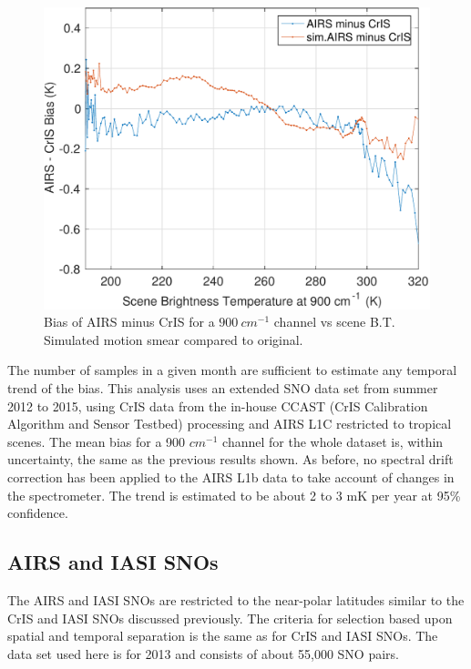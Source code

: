 \documentclass[twocolumn,10pt]{article}
\begin{document}
\begin{figure}[htb]
\centering
\includegraphics[width=\linewidth]{./figs/2013_ac_quantile_plus_simulated_airs.pdf}
\caption{
  Bias of AIRS minus CrIS for a $900\ cm^{-1}$ channel vs scene B.T. Simulated motion smear compared to original.}
\label{fig:Y9}
\end{figure}

The number of samples in a given month are sufficient to estimate any temporal trend of the bias. This analysis uses an extended SNO data set from summer 2012 to 2015, using CrIS data from the in-house CCAST (CrIS Calibration Algorithm and Sensor Testbed) processing \cite{Motteler2014} and AIRS L1C restricted to tropical scenes. The mean
bias for a 900 $cm^{-1}$ channel for the whole dataset is, within uncertainty, the same as the previous results shown. As before, no spectral drift correction has been applied to the AIRS L1b data to take account of changes in the spectrometer. The trend is estimated to be about 2 to 3 mK per year at 95\% confidence. 



\subsection{AIRS and IASI SNOs}
The AIRS and IASI SNOs are restricted to the near-polar latitudes similar to the 
CrIS and IASI SNOs discussed previously. The criteria for selection based upon spatial and temporal separation is the same as for CrIS and IASI SNOs. The data set used here is for 2013 and consists of about 55,000 SNO pairs. 
\end{document}
